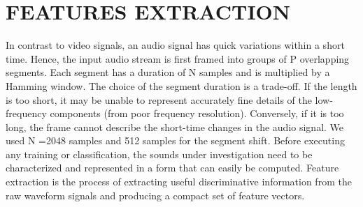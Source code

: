 \documentclass{ieeeaccess}
\begin{document}
\section{FEATURES EXTRACTION}  \label{sec:IV}
In contrast to video signals, an audio signal has quick variations within a short time. Hence,  the input audio stream is first framed into groups of P overlapping segments. Each segment has a duration of N samples and is multiplied by a Hamming window. The choice of the segment duration is a trade-off. If the length is too short, it may be unable to represent accurately fine details of the low-frequency components (from poor frequency resolution). Conversely, if it is too long, the frame cannot describe the short-time changes in the audio signal. We used N  =2048 samples and 512 samples for the segment shift. Before executing any training or classification, the sounds under investigation need to be characterized and represented in a form that can easily be computed. Feature extraction is the process of extracting useful discriminative information from the raw waveform signals and producing a compact set of feature vectors.
\end{document}
